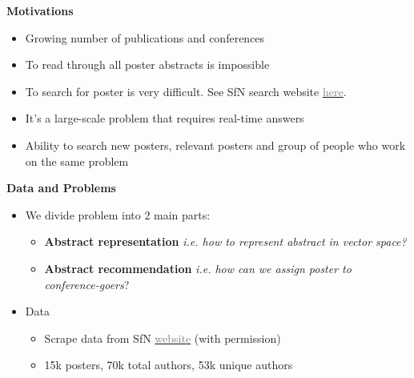 \begin{frame}{\textbf{Motivations}}

\begin{itemize}
\item Growing number of publications and conferences
\item To read through all poster abstracts is impossible
\item To search for poster is very difficult. See SfN search website \href{http://www.abstractsonline.com/plan/BrowseResults.aspx?date=11/15/2014&mkey=\%7B54C85D94-6D69-4B09-AFAA-502C0E680CA7\%7D}{\textcolor{gray}{here}}.
\item It's a large-scale problem that requires real-time answers\pause
\item Ability to search new posters, relevant posters and group of people who work on the same problem
\end{itemize}

\end{frame}



\begin{frame}{\textbf{Data and Problems}}

\begin{itemize}

\item We divide problem into 2 main parts:
\begin{itemize}
\item \textbf{Abstract representation} \textit{i.e. how to represent abstract in vector space?}
\item \textbf{Abstract recommendation} \textit{i.e. how can we assign poster to conference-goers}?
\end{itemize}

\item Data
\begin{itemize}
\item Scrape data from SfN \href{http://www.abstractsonline.com/plan/BrowseResults.aspx?date=11/15/2014&mkey=\%7B54C85D94-6D69-4B09-AFAA-502C0E680CA7\%7D}{\textcolor{gray}{website}} (with permission)
\item 15k posters, 70k total authors, 53k unique authors
\end{itemize}

\end{itemize}

\end{frame}